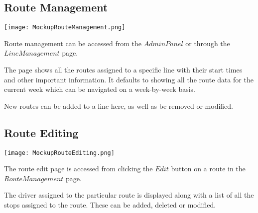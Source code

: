 \subsection{Route Management}

\texttt{[image: MockupRouteManagement.png]}

\medskip

Route management can be accessed from the $Admin Panel$ or through
the $Line Management$ page.

\medskip

The page shows all the routes assigned to a specific line with their
start times and other important information. It defaults to showing
all the route data for the current week which can be navigated on a
week-by-week basis.

\medskip

New routes can be added to a line here, as well as be removed or
modified.

\subsection{Route Editing}

\texttt{[image: MockupRouteEditing.png]}

\medskip

The route edit page is accessed from clicking the $Edit$ button on a
route in the $Route Management$ page.

\medskip

The driver assigned to the particular route is displayed along with
a list of all the stops assigned to the route. These can be added,
deleted or modified.
